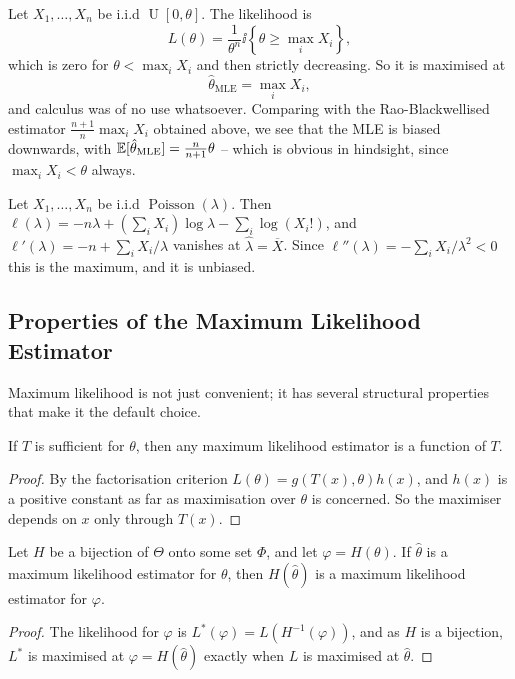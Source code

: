 \documentclass[a4paper]{scrartcl}
\newcommand{\Poisson}{\operatorname{Poisson}}
\newcommand{\Unif}{\operatorname{U}}
\begin{document}
\begin{example}
  Let $X_1, \dots, X_n$ be i.i.d $\Unif[0,\theta]$. The likelihood is
  $$
  L(\theta) = \frac{1}{\theta^n}\ii\left\{\theta \geq \max_i X_i\right\},
  $$
  which is zero for $\theta < \max_i X_i$ and then strictly decreasing. So it is maximised at
  $$
  \hat\theta_{\mathrm{MLE}} = \max_i X_i,
  $$
  and calculus was of no use whatsoever. Comparing with the Rao-Blackwellised estimator $\frac{n+1}{n}\max_i X_i$ obtained above, we see that the MLE is biased downwards, with $\mathbb{E}[\hat\theta_{\mathrm{MLE}}] = \frac{n}{n+1}\theta$ -- which is obvious in hindsight, since $\max_i X_i < \theta$ always.
\end{example}

\begin{example}[Poisson]
  Let $X_1, \dots, X_n$ be i.i.d $\Poisson(\lambda)$. Then $\ell(\lambda) = -n\lambda + \left(\sum_i X_i\right)\log\lambda - \sum_i \log(X_i!)$, and $\ell'(\lambda) = -n + \sum_i X_i/\lambda$ vanishes at $\hat\lambda = \overline{X}$. Since $\ell''(\lambda) = -\sum_i X_i/\lambda^2 < 0$ this is the maximum, and it is unbiased.
\end{example}

\subsection{Properties of the Maximum Likelihood Estimator}

Maximum likelihood is not just convenient; it has several structural properties that make it the default choice.

\begin{proposition}
  If $T$ is sufficient for $\theta$, then any maximum likelihood estimator is a function of $T$.
\end{proposition}
\begin{proof}
  By the factorisation criterion $L(\theta) = g(T(x),\theta)h(x)$, and $h(x)$ is a positive constant as far as maximisation over $\theta$ is concerned. So the maximiser depends on $x$ only through $T(x)$.
\end{proof}

\begin{proposition}[Invariance]
  Let $H$ be a bijection of $\Theta$ onto some set $\Phi$, and let $\varphi = H(\theta)$. If $\hat\theta$ is a maximum likelihood estimator for $\theta$, then $H(\hat\theta)$ is a maximum likelihood estimator for $\varphi$.
\end{proposition}
\begin{proof}
  The likelihood for $\varphi$ is $L^*(\varphi) = L(H^{-1}(\varphi))$, and as $H$ is a bijection, $L^*$ is maximised at $\varphi = H(\hat\theta)$ exactly when $L$ is maximised at $\hat\theta$.
\end{proof}
\end{document}
